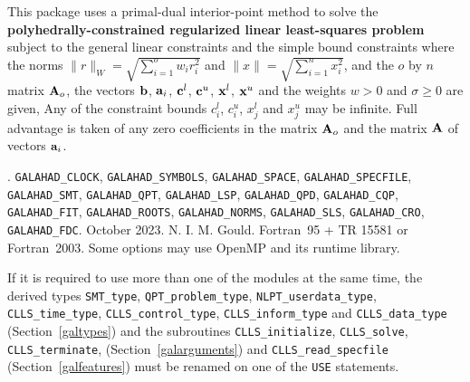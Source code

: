 \documentclass{galahad}
\newcommand{\packagename}{CLLS}
\newcommand{\fullpackagename}{\libraryname\_\packagename}
\begin{document}
\galheader


\galsummary
This package uses a primal-dual interior-point method to solve the
{\bf polyhedrally-constrained regularized linear least-squares problem}
subject to the general linear constraints
and the simple bound constraints
where the norms $\|r\|_W = \sqrt{\sum_{i=1}^o w_i r_i^2}$
and $\|x\| = \sqrt{\sum_{i=1}^n x_i^2}$,
and the $o$ by $n$ matrix ${\mathbf{A}}_o$, the
vectors ${\mathbf{b}}$, ${\mathbf{a}}_{i}$, ${\mathbf{c}}^{l}$, ${\mathbf{c}}^{u}$, ${\mathbf{x}}^{l}$,
${\mathbf{x}}^{u}$ and the weights $w > 0$ and $\sigma \geq 0$ are given,
Any of the constraint bounds $c_{i}^{l}$, $c_{i}^{u}$,
$x_{j}^{l}$ and $x_{j}^{u}$ may be infinite.
Full advantage is taken of any zero coefficients in the matrix ${\mathbf{A}}_o$
and the matrix ${\mathbf{A}}$ of vectors ${\mathbf{a}}_{i}$.


\galattributes
\galversions{\tt  \fullpackagename\_single, \fullpackagename\_double}.
\galuses
{\tt GALAHAD\_CLOCK},
{\tt GALAHAD\_SY\-M\-BOLS},
{\tt GALAHAD\-\_SPACE},
{\tt GALAHAD\_SPECFILE},
{\tt GALAHAD\_SMT},
{\tt GALAHAD\_QPT},
{\tt GALAHAD\_LSP},
{\tt GALAHAD\_\-QPD},
{\tt GALAHAD\_\-CQP},
{\tt GALAHAD\_\-FIT},
{\tt GALAHAD\_\-ROOTS},
{\tt GALAHAD\_\-NORMS},
{\tt GALAHAD\_\-SLS},
{\tt GALAHAD\_\-CRO},
{\tt GALAHAD\_FDC}.
\galdate October 2023.
\galorigin N. I. M. Gould.
\gallanguage Fortran~95 + TR 15581 or Fortran~2003.
\galparallelism Some options may use OpenMP and its runtime library.


\galhowto




\noindent
If it is required to use more than one of the modules at the same time, 
the derived types
{\tt SMT\_type},
{\tt QPT\_problem\_type},
{\tt NLPT\_userdata\-\_type},
{\tt \packagename\_time\_type},
{\tt \packagename\_control\_type},
{\tt \packagename\_inform\_type}
and
{\tt \packagename\_data\_type}
(Section~\ref{galtypes})
and the subroutines
{\tt \packagename\_initialize},
{\tt \packagename\_\-solve},
{\tt \packagename\_terminate},
(Section~\ref{galarguments})
and
{\tt \packagename\_read\_specfile}
(Section~\ref{galfeatures})
must be renamed on one of the {\tt USE} statements.
\end{document}
